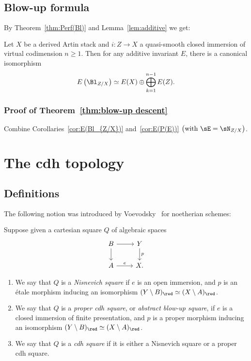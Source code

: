 \subsection{Blow-up formula}\label{ssec:blowup/additive}


By Theorem~\ref{thm:Perf(Bl)} and Lemma~\ref{lem:additive} we get:

\begin{coro}\label{cor:E(Bl_{Z/X})}
Let $X$ be a derived Artin stack and $i : Z \to X$ a quasi-smooth closed immersion of virtual codimension $n\ge 1$. Then for any additive invariant $E$, there is a canonical isomorphism
\[
E\left(\Bl_{Z/X}\right) \simeq E(X) \oplus \bigoplus_{k=1}^{n-1} E(Z).
\]
\end{coro}

\subsubsection{Proof of Theorem~\ref{thm:blow-up descent}}\label{sssec:proof of blow-up descent}

Combine Corollaries~\ref{cor:E(Bl_{Z/X})} and~\ref{cor:E(P(E))} $\left(\text{with }\sE = \sN_{Z/X}\right)$.

\section{The cdh topology}\label{sec:cdh}

\subsection{Definitions}

The following notion was introduced by Voevodsky~\cite{VoevodskyCdh} for noetherian schemes:

\begin{defi}\label{defn:cdh square}
Suppose given a cartesian square $Q$ of algebraic spaces
\begin{equation}\label{eq:cdh square}
\begin{tikzcd}
B \ar{r}\ar{d} & Y \ar{d}{p}
\\
A \ar{r}{e} & X.
\end{tikzcd}
\end{equation}
\begin{enumerate}\romanenumi
\item \label{item:cdh square/Nis square}
We say that $Q$ is a \emph{Nisnevich square} if $e$ is an open immersion, and $p$ is an étale morphism inducing an isomorphism $(Y\setminus B)_\red \simeq (X\setminus A)_\red$.
\item \label{item:cdh square/proper cdh square}
We say that $Q$ is a \emph{proper cdh square}, or \emph{abstract blow-up square}, if $e$ is a closed immersion of finite presentation, and $p$ is a proper morphism inducing an isomorphism $(Y\setminus B)_\red \simeq (X\setminus A)_\red$.
\item \label{item:cdh square/cdh square}
We say that $Q$ is a \emph{cdh square} if it is either a Nisnevich square or a proper cdh square.
\end{enumerate}
\end{defi}


